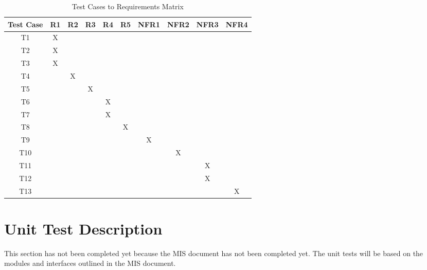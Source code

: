\documentclass[12pt, titlepage]{article}
\begin{document}
\begin{table}[h]
\centering
\begin{tabular}{|c|c|c|c|c|c|c|c|c|c|}
\hline
\textbf{Test Case} & \textbf{R1} & \textbf{R2} & \textbf{R3} & \textbf{R4} & \textbf{R5} & \textbf{NFR1} & \textbf{NFR2} & \textbf{NFR3} & \textbf{NFR4} \\ \hline
T1 & X &   &   &   &   &   &   &   &   \\ \hline
T2 & X &   &   &   &   &   &   &   &   \\ \hline
T3 & X &   &   &   &   &   &   &   &   \\ \hline
T4 &   & X &   &   &   &   &   &   &   \\ \hline
T5 &   &   & X &   &   &   &   &   &   \\ \hline
T6 &   &   &   & X &   &   &   &   &   \\ \hline
T7 &   &   &   & X &   &   &   &   &   \\ \hline
T8 &   &   &   &   & X &   &   &   &   \\ \hline
T9 &   &   &   &   &   & X &   &   &   \\ \hline
T10 &  &   &   &   &   &   & X &   &   \\ \hline
T11 &  &   &   &   &   &   &   & X &   \\ \hline
T12 &  &   &   &   &   &   &   & X &   \\ \hline
T13 &  &   &   &   &   &   &   &   & X \\ \hline
\end{tabular}
\caption{Test Cases to Requirements Matrix}
\label{tab:test-requirements-matrix}
\end{table}

\section{Unit Test Description}

This section has not been completed yet because the MIS document has not been
completed yet. The unit tests will be based on the modules and interfaces
outlined in the MIS document.



\end{document}
